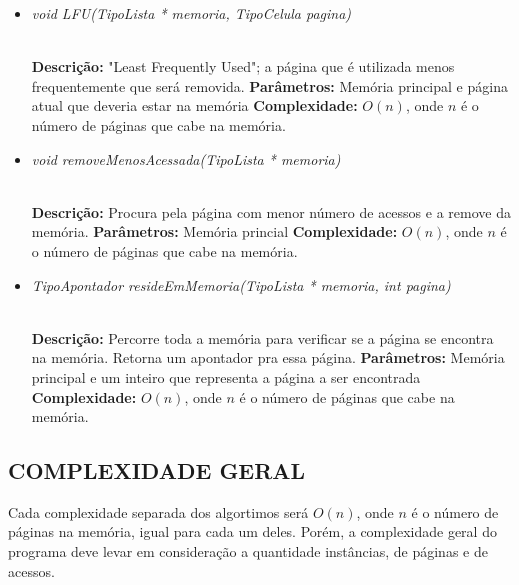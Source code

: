 \documentclass[12pt]{article}
\begin{document}
\begin{itemize}
 \item \begin{large}\textit{void LFU(TipoLista * memoria, TipoCelula pagina)}\end{large}\\
 \subitem \textbf{Descrição:} "Least Frequently Used"; a página que é utilizada menos frequentemente que será removida.
 \subitem \textbf{Parâmetros:} Memória principal e página atual que deveria estar na memória
 \subitem \textbf{Complexidade:} $O(n)$, onde $n$ é o número de páginas que cabe na memória.
\end{itemize}

\vspace{0.2 true cm}

\begin{itemize}
 \item \begin{large}\textit{void removeMenosAcessada(TipoLista * memoria)}\end{large}\\
 \subitem \textbf{Descrição:} Procura pela página com menor número de acessos e a remove da memória.
 \subitem \textbf{Parâmetros:} Memória princial
 \subitem \textbf{Complexidade:} $O(n)$, onde $n$ é o número de páginas que cabe na memória.
\end{itemize}

\vspace{0.2 true cm}

\begin{itemize}
 \item \begin{large}\textit{TipoApontador resideEmMemoria(TipoLista * memoria, int pagina)}\end{large}\\
 \subitem \textbf{Descrição:} Percorre toda a memória para verificar se a página se encontra na memória. Retorna um apontador pra essa página.
 \subitem \textbf{Parâmetros:} Memória principal e um inteiro que representa a página a ser encontrada
 \subitem \textbf{Complexidade:} $O(n)$, onde $n$ é o número de páginas que cabe na memória.
\end{itemize}

\subsection{COMPLEXIDADE GERAL}
\label{complexidades}

Cada complexidade separada dos algortimos será $O(n)$, onde $n$ é o número de páginas na memória, igual para cada um deles. Porém, a complexidade geral do programa deve levar em consideração a quantidade instâncias, de páginas e de acessos.
\end{document}
